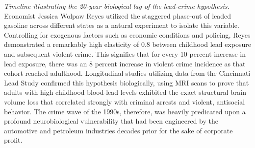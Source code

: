 \documentclass[
]{article}
\begin{document}
\emph{Timeline illustrating the 20-year biological lag of the lead-crime
hypothesis.}\\
Economist Jessica Wolpaw Reyes utilized the staggered phase-out of
leaded gasoline across different states as a natural experiment to
isolate this variable. Controlling for exogenous factors such as
economic conditions and policing, Reyes demonstrated a remarkably high
elasticity of 0.8 between childhood lead exposure and subsequent violent
crime. This signifies that for every 10 percent increase in lead
exposure, there was an 8 percent increase in violent crime incidence as
that cohort reached adulthood. Longitudinal studies utilizing data from
the Cincinnati Lead Study confirmed this hypothesis biologically, using
MRI scans to prove that adults with high childhood blood-lead levels
exhibited the exact structural brain volume loss that correlated
strongly with criminal arrests and violent, antisocial behavior. The
crime wave of the 1990s, therefore, was heavily predicated upon a
profound neurobiological vulnerability that had been engineered by the
automotive and petroleum industries decades prior for the sake of
corporate profit.
\end{document}
